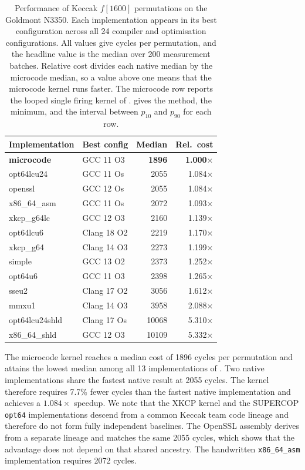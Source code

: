 \documentclass[journal=tches,submission]{iacrtrans}
\begin{document}
\begin{table}[!ht]
\centering
\caption{Performance of Keccak $f[1600]$ permutations on the Goldmont N3350.
Each implementation appears in its best configuration across all 24 compiler and optimisation configurations.
All values give cycles per permutation, and the headline value is the median over 200 measurement batches.
Relative cost divides each native median by the microcode median, so a value above one means that the microcode kernel runs faster.
The microcode row reports the looped single firing kernel of .
 gives the method, the minimum, and the interval between $p_{10}$ and $p_{90}$ for each row.}
\label{tab:results-keccak}
\footnotesize
\setlength{\tabcolsep}{4pt}
\begin{tabular}{@{}llrr@{}}
\toprule
Implementation & Best config & Median & Rel.\ cost \\
\midrule
\textbf{microcode} & GCC 11 O3  & \textbf{1896} & \textbf{1.000$\times$} \\
\midrule
opt64lcu24        & GCC 11 Os   & 2055  & 1.084$\times$ \\
openssl           & GCC 12 Os   & 2055  & 1.084$\times$ \\
x86\_64\_asm      & GCC 11 Os   & 2072  & 1.093$\times$ \\
xkcp\_g64lc       & GCC 12 O3   & 2160  & 1.139$\times$ \\
opt64lcu6         & Clang 18 O2 & 2219  & 1.170$\times$ \\
xkcp\_g64         & Clang 14 O3 & 2273  & 1.199$\times$ \\
simple            & GCC 13 O2   & 2373  & 1.252$\times$ \\
opt64u6           & GCC 11 O3   & 2398  & 1.265$\times$ \\
sseu2             & Clang 17 O2 & 3056  & 1.612$\times$ \\
mmxu1             & Clang 14 O3 & 3958  & 2.088$\times$ \\
opt64lcu24shld    & Clang 17 Os & 10068 & 5.310$\times$ \\
x86\_64\_shld     & GCC 12 O3   & 10109 & 5.332$\times$ \\
\bottomrule
\end{tabular}
\end{table}

The microcode kernel reaches a median cost of 1896 cycles per permutation and attains the lowest median among all 13 implementations of .
Two native implementations share the fastest native result at 2055 cycles.
The kernel therefore requires 7.7\% fewer cycles than the fastest native implementation and achieves a $1.084\times$ speedup.
We note that the XKCP kernel and the SUPERCOP \texttt{opt64} implementations descend from a common Keccak team code lineage and therefore do not form fully independent baselines.
The OpenSSL assembly derives from a separate lineage and matches the same 2055 cycles, which shows that the advantage does not depend on that shared ancestry.
The handwritten \texttt{x86\_64\_asm} implementation requires 2072 cycles.
\end{document}
